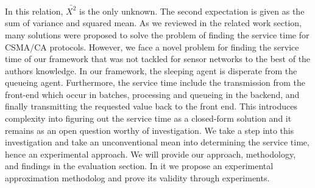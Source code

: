 In this relation, $\bar{X^2}$ is the only unknown. The second expectation is given as the sum of variance and squared mean. As we reviewed in the related work section, many solutions were proposed to solve the problem of finding the service time for CSMA/CA protocols. However, we face a novel problem for finding the service time of our framework that was not tackled for sensor networks to the best of the authors knowledge. In our framework, the sleeping agent is disperate from the queueing agent. Furthermore, the service time include the transmission from the front-end which occur in batches, processing and queueing in the backend, and finally transmitting the requested value back to the front end. This introduces complexity into figuring out the service time as a closed-form solution and it remains as an open question worthy of investigation. We take a step into this investigation and take an unconventional mean into determining the service time, hence an experimental approach. We will provide our approach, methodology, and findings in the evaluation section. In it we propose an experimental approximation methodolog and prove its validity through experiments.

